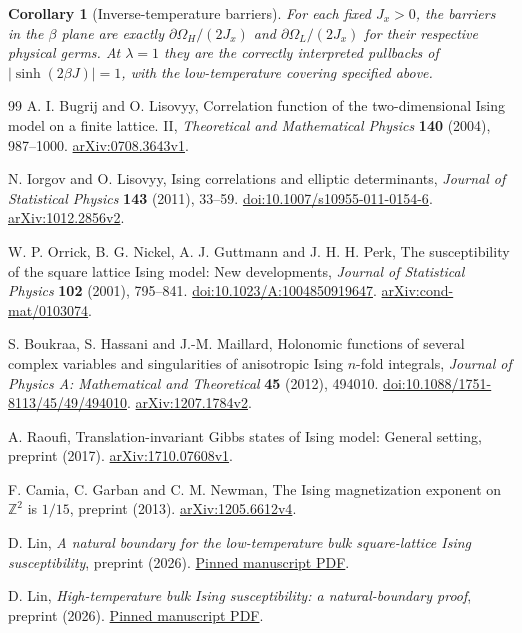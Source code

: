\documentclass[11pt]{article}
\numberwithin{equation}{section}
\newtheorem{corollary}[theorem]{Corollary}
\theoremstyle{definition}
\newcommand{\OH}{\Omega_H}
\newcommand{\OL}{\Omega_L}
\begin{document}
\begin{corollary}[Inverse-temperature barriers]\label{cor:alllambda}
For each fixed $J_x>0$, the barriers in the $\beta$ plane are exactly
$\partial\OH/(2J_x)$ and $\partial\OL/(2J_x)$ for their respective
physical germs. At $\lambda=1$ they are the correctly interpreted
pullbacks of $|\sinh(2\beta J)|=1$, with the low-temperature covering
specified above.
\end{corollary}


\begin{thebibliography}{99}
 A. I. Bugrij and O. Lisovyy,
Correlation function of the two-dimensional Ising model on a finite lattice. II,
\emph{Theoretical and Mathematical Physics} \textbf{140} (2004), 987--1000.
\href{https://arxiv.org/abs/0708.3643v1}{arXiv:0708.3643v1}.

 N. Iorgov and O. Lisovyy,
Ising correlations and elliptic determinants,
\emph{Journal of Statistical Physics} \textbf{143} (2011), 33--59.
\href{https://doi.org/10.1007/s10955-011-0154-6}{doi:10.1007/s10955-011-0154-6}.
\href{https://arxiv.org/abs/1012.2856v2}{arXiv:1012.2856v2}.

 W. P. Orrick, B. G. Nickel, A. J. Guttmann and J. H. H. Perk,
The susceptibility of the square lattice Ising model: New developments,
\emph{Journal of Statistical Physics} \textbf{102} (2001), 795--841.
\href{https://doi.org/10.1023/A:1004850919647}{doi:10.1023/A:1004850919647}.
\href{https://arxiv.org/abs/cond-mat/0103074}{arXiv:cond-mat/0103074}.

 S. Boukraa, S. Hassani and J.-M. Maillard,
Holonomic functions of several complex variables and singularities of
anisotropic Ising $n$-fold integrals,
\emph{Journal of Physics A: Mathematical and Theoretical}
\textbf{45} (2012), 494010.
\href{https://doi.org/10.1088/1751-8113/45/49/494010}{doi:10.1088/1751-8113/45/49/494010}.
\href{https://arxiv.org/abs/1207.1784v2}{arXiv:1207.1784v2}.

 A. Raoufi,
Translation-invariant Gibbs states of Ising model: General setting,
preprint (2017).
\href{https://arxiv.org/abs/1710.07608v1}{arXiv:1710.07608v1}.

 F. Camia, C. Garban and C. M. Newman,
The Ising magnetization exponent on $\mathbb Z^2$ is $1/15$,
preprint (2013).
\href{https://arxiv.org/abs/1205.6612v4}{arXiv:1205.6612v4}.

 D. Lin,
\emph{A natural boundary for the low-temperature bulk square-lattice
Ising susceptibility}, preprint (2026).
\href{https://github.com/LeoLam233/ising-bulk-natural-boundary/blob/923266754afd65f5922a51f59a72ca56e1a88942/paper/lt/reader/manuscript.pdf}{Pinned manuscript PDF}.

 D. Lin,
\emph{High-temperature bulk Ising susceptibility: a natural-boundary proof},
preprint (2026).
\href{https://github.com/LeoLam233/ising-bulk-natural-boundary/blob/923266754afd65f5922a51f59a72ca56e1a88942/paper/ht/reader/manuscript.pdf}{Pinned manuscript PDF}.
\end{thebibliography}
\end{document}
